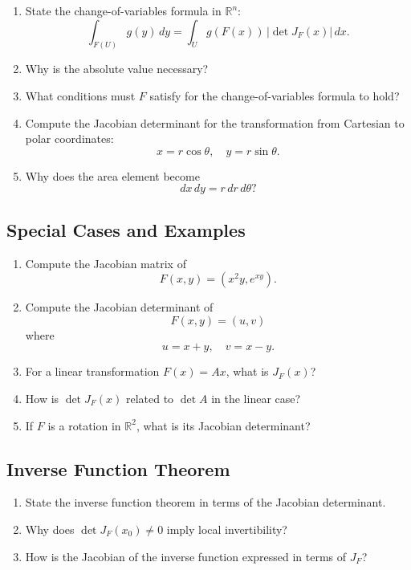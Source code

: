 \begin{enumerate}

\item State the change-of-variables formula in $\mathbb{R}^n$:
  \[
    \int_{F(U)} g(y)\,dy
    =
    \int_U g(F(x))\, |\det J_F(x)| \, dx.
  \]

\item Why is the absolute value necessary?

\item What conditions must $F$ satisfy for the change-of-variables formula to hold?

\item Compute the Jacobian determinant for the transformation from Cartesian to polar coordinates:
  \[
    x = r\cos\theta, \quad y = r\sin\theta.
  \]

\item Why does the area element become
  \[
    dx\,dy = r\,dr\,d\theta?
  \]

\end{enumerate}

\subsection{Special Cases and Examples}

\begin{enumerate}

\item Compute the Jacobian matrix of
  \[
    F(x,y) = (x^2 y, e^{xy}).
  \]

\item Compute the Jacobian determinant of
  \[
    F(x,y) = (u,v)
  \]
  where
  \[
    u = x+y, \quad v = x-y.
  \]

\item For a linear transformation $F(x)=Ax$, what is $J_F(x)$?

\item How is $\det J_F(x)$ related to $\det A$ in the linear case?

\item If $F$ is a rotation in $\mathbb{R}^2$, what is its Jacobian determinant?

\end{enumerate}

\subsection{Inverse Function Theorem}

\begin{enumerate}

\item State the inverse function theorem in terms of the Jacobian determinant.

\item Why does $\det J_F(x_0) \neq 0$ imply local invertibility?

\item How is the Jacobian of the inverse function expressed in terms of $J_F$?

\end{enumerate}

